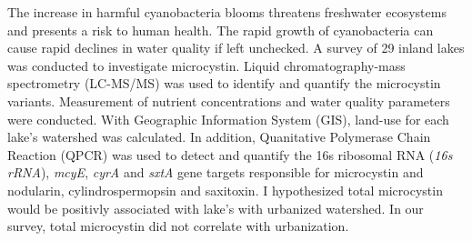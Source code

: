 The increase in harmful cyanobacteria blooms threatens freshwater ecosystems and presents a risk to human health. The rapid growth of cyanobacteria can cause rapid declines in water quality if left unchecked. A survey of 29 inland lakes was conducted to investigate microcystin. Liquid chromatography-mass spectrometry (LC-MS/MS) was used to identify and quantify the microcystin variants. Measurement of nutrient concentrations and water quality parameters were conducted. With Geographic Information System (GIS), land-use for each lake's watershed was calculated. In addition, Quanitative Polymerase Chain Reaction (QPCR) was used to detect and quantify the 16s ribosomal RNA (\emph{16s rRNA}), \emph{mcyE}, \emph{cyrA} and \emph{sxtA} gene targets responsible for microcystin and nodularin, cylindrospermopsin and saxitoxin.  I hypothesized total microcystin would be positivly associated with lake's with urbanized watershed. In our survey, total microcystin did not correlate with urbanization. 
